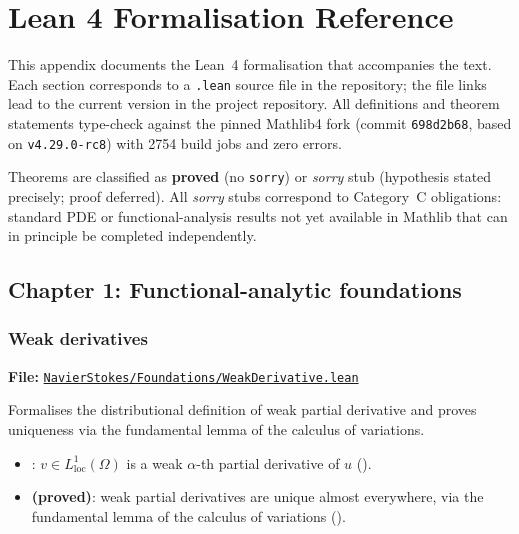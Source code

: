 \chapter{Lean 4 Formalisation Reference}\label{app:lean}

This appendix documents the Lean~4 formalisation that accompanies the text.
Each section corresponds to a \texttt{.lean} source file in the repository;
the file links lead to the current version in the project repository.  All
definitions and theorem statements type-check against the pinned Mathlib4 fork
(commit \texttt{698d2b68}, based on \texttt{v4.29.0-rc8}) with 2754 build jobs
and zero errors.

Theorems are classified as \textbf{proved} (no \texttt{sorry}) or
\textit{sorry} stub (hypothesis stated precisely; proof deferred).  All
\textit{sorry} stubs correspond to Category~C obligations: standard PDE or
functional-analysis results not yet available in Mathlib that can in principle
be completed independently.

\section{Chapter 1: Functional-analytic foundations}\label{sec:lean-ch1}

\subsection{Weak derivatives}\label{sec:lean-ch1-weakderiv}

\textbf{File:}
\href{https://github.com/alejandro-soto-franco/navier-stokes/blob/master/lean/NavierStokes/Foundations/WeakDerivative.lean}%
{\texttt{NavierStokes/Foundations/WeakDerivative.lean}}

\medskip\noindent
Formalises the distributional definition of weak partial derivative and proves
uniqueness via the fundamental lemma of the calculus of variations.

\begin{itemize}
  \item {}: $v \in
    L^{1}_{\mathrm{loc}}(\Omega)$ is a weak $\alpha$-th partial derivative of $u$
    ().
  \item {} \textbf{(proved)}: weak
    partial derivatives are unique almost everywhere, via the fundamental lemma
    of the calculus of variations ().
\end{itemize}

